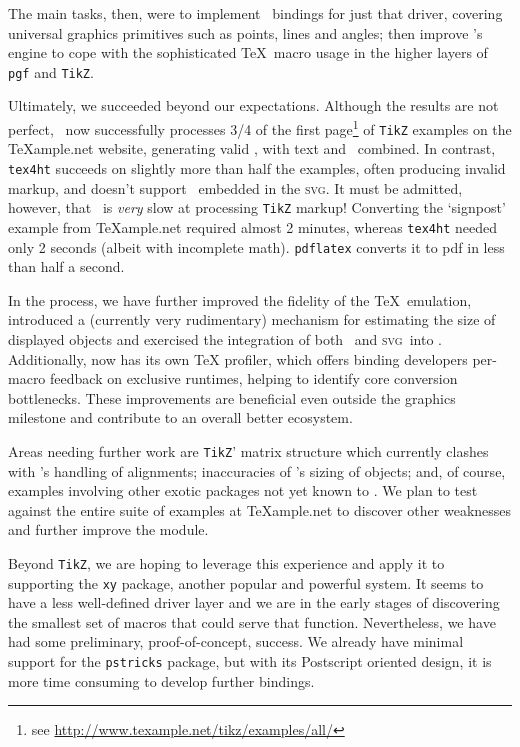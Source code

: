 \documentclass{llncs}
\def\svg{\textsc{svg}\xspace}
\def\tikz{\texttt{TikZ}\xspace}
\begin{document}
The main tasks, then, were to implement \LaTeXML\ bindings
for just that driver, covering universal graphics primitives such as points, lines and angles;
then improve \LaTeXML's engine to cope
with the sophisticated \TeX\ macro usage in the higher
layers of \texttt{pgf} and \tikz.

Ultimately, we succeeded beyond our expectations.
Although the results are not perfect,
\LaTeXML\ now successfully processes 3/4 of the
first page\footnote{see \url{http://www.texample.net/tikz/examples/all/}} of \tikz examples on the
{\TeX}ample.net website, generating valid
, with text and \MathML\ combined.
In contrast, \texttt{tex4ht} succeeds on slightly more
than half the examples, often producing invalid markup,
and doesn't support \MathML\ embedded in the \svg.
It must be admitted, however, that \LaTeXML\ is \emph{very}
slow at processing \tikz markup!
Converting the `signpost' example from \TeX ample.net
required almost 2 minutes, whereas \texttt{tex4ht} needed
only 2 seconds (albeit with incomplete math).
\texttt{pdflatex} converts it to pdf in less than half a second.

In the process, we have further improved the
fidelity of the \TeX\ emulation, introduced
a (currently very rudimentary) mechanism for estimating
the size of displayed objects and exercised the
integration of both \MathML\ and \svg\ into \HTML. 
Additionally, {\LaTeXML} now has its own {\TeX} profiler, which
offers binding developers per-macro feedback on
exclusive runtimes, helping to identify core conversion bottlenecks.
These improvements are beneficial even outside the graphics milestone and
contribute to an overall better {\LaTeXML} ecosystem.

Areas needing further work are \tikz' matrix
structure which currently clashes with \LaTeXML's handling
of alignments; inaccuracies of \LaTeXML's sizing of objects;
and, of course, examples involving other exotic packages
not yet known to \LaTeXML.  We plan to test against
the entire suite of examples at {\TeX}ample.net to discover
other weaknesses and further improve the module.

Beyond \tikz, we are hoping to leverage this experience and apply
it to supporting the \texttt{xy} package, another
popular and powerful system.  It seems to have a less
well-defined driver layer and we are in the early stages of
discovering the smallest set of macros that could serve that
function. Nevertheless, we have had some preliminary, proof-of-concept, success.
We already have minimal support for the \texttt{pstricks}
package, but with its Postscript oriented design,
it is more time consuming to develop further bindings.
\end{document}
